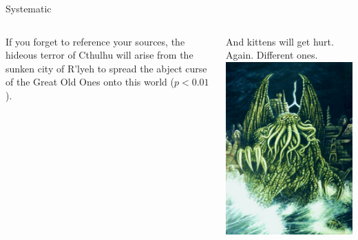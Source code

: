\documentclass[t]{beamer}
\begin{document}
	\begin{frame}[t]{Systematic }
		\begin{columns}[T]
			If you forget to reference your sources, the hideous terror of Cthulhu will arise from the sunken city of R'lyeh to spread the abject curse of the Great Old Ones onto this world ($p < 0.01$).\vspace{1em}
		
			And kittens will get hurt. Again. Different ones.
			\includegraphics[height=.66\paperheight]{cthulhu.jpg}
		\end{columns}
	\end{frame}
	
\end{document}
